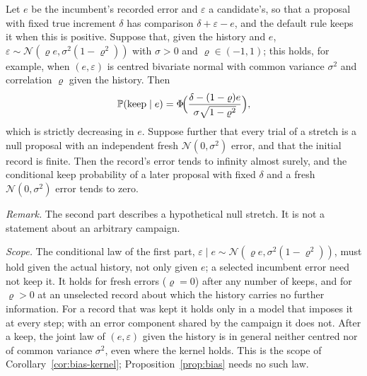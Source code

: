 \begin{proposition}\label{prop:app-record}
Let $e$ be the incumbent's recorded error and $\varepsilon$ a candidate's, so that a proposal with fixed true increment $\delta$ has comparison $\delta+\varepsilon-e$, and the default rule keeps it when this is positive. Suppose that, given the history and $e$, $\varepsilon\sim\mathcal{N}(\varrho e,\sigma^2(1-\varrho^2))$ with $\sigma>0$ and $\varrho\in(-1,1)$; this holds, for example, when $(e,\varepsilon)$ is centred bivariate normal with common variance $\sigma^2$ and correlation $\varrho$ given the history. Then
\[
\mathbb{P}(\mathrm{keep}\mid e)=\Phi\!\Bigl(\frac{\delta-(1-\varrho)e}{\sigma\sqrt{1-\varrho^2}}\Bigr),
\]
which is strictly decreasing in $e$. Suppose further that every trial of a stretch is a null proposal with an independent fresh $\mathcal{N}(0,\sigma^2)$ error, and that the initial record is finite. Then the record's error tends to infinity almost surely, and the conditional keep probability of a later proposal with fixed $\delta$ and a fresh $\mathcal{N}(0,\sigma^2)$ error tends to zero.
\end{proposition}

\emph{Remark.} The second part describes a hypothetical null stretch. It is not a statement about an arbitrary campaign.

\emph{Scope.} The conditional law of the first part, $\varepsilon\mid e\sim\mathcal{N}(\varrho e,\sigma^2(1-\varrho^2))$, must hold given the actual history, not only given $e$; a selected incumbent error need not keep it. It holds for fresh errors ($\varrho=0$) after any number of keeps, and for $\varrho>0$ at an unselected record about which the history carries no further information. For a record that was kept it holds only in a model that imposes it at every step; with an error component shared by the campaign it does not. After a keep, the joint law of $(e,\varepsilon)$ given the history is in general neither centred nor of common variance $\sigma^2$, even where the kernel holds. This is the scope of Corollary~\ref{cor:bias-kernel}; Proposition~\ref{prop:bias} needs no such law.

